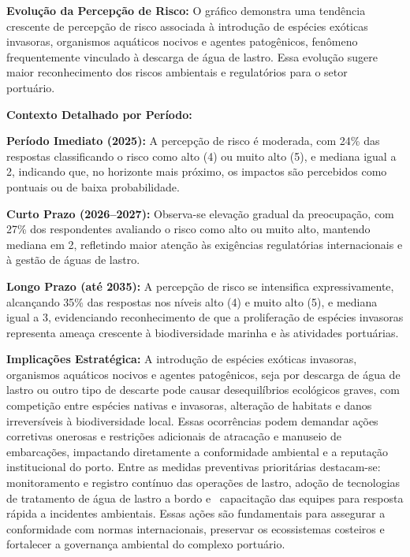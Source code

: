 \documentclass[
  portuguese,
  letterpaper,
  DIV=11,
  numbers=noendperiod]{scrreprt}
\begin{document}
\begin{tcolorbox}[enhanced jigsaw, breakable, leftrule=.75mm, opacitybacktitle=0.6, coltitle=black, rightrule=.15mm, colbacktitle=quarto-callout-tip-color!10!white, colframe=quarto-callout-tip-color-frame, titlerule=0mm, bottomtitle=1mm, colback=white, toprule=.15mm, toptitle=1mm, left=2mm, title=\textcolor{quarto-callout-tip-color}{\faLightbulb}\hspace{0.5em}{Destaques}, opacityback=0, bottomrule=.15mm, arc=.35mm]

\textbf{Evolução da Percepção de Risco:} O gráfico demonstra uma
tendência crescente de percepção de risco associada à introdução de
espécies exóticas invasoras, organismos aquáticos nocivos e agentes
patogênicos, fenômeno frequentemente vinculado à descarga de água de
lastro. Essa evolução sugere maior reconhecimento dos riscos ambientais
e regulatórios para o setor portuário.~

\textbf{Contexto Detalhado por Período:}

\textbf{Período Imediato (2025):} A percepção de risco é moderada, com
24\% das respostas classificando o risco como alto (4) ou muito alto
(5), e mediana igual a 2, indicando que, no horizonte mais próximo, os
impactos são percebidos como pontuais ou de baixa probabilidade.

\textbf{Curto Prazo (2026--2027):} Observa-se elevação gradual da
preocupação, com 27\% dos respondentes avaliando o risco como alto ou
muito alto, mantendo mediana em 2, refletindo maior atenção às
exigências regulatórias internacionais e à gestão de águas de lastro.

\textbf{Longo Prazo (até 2035):} A percepção de risco se intensifica
expressivamente, alcançando 35\% das respostas nos níveis alto (4) e
muito alto (5), e mediana igual a 3, evidenciando reconhecimento de que
a proliferação de espécies invasoras representa ameaça crescente à
biodiversidade marinha e às atividades portuárias.

\textbf{Implicações Estratégica:} A introdução de espécies exóticas
invasoras, organismos aquáticos nocivos e agentes patogênicos, seja por
descarga de água de lastro ou outro tipo de descarte pode causar
desequilíbrios ecológicos graves, com competição entre espécies nativas
e invasoras, alteração de habitats e danos irreversíveis à
biodiversidade local. Essas ocorrências podem demandar ações corretivas
onerosas e restrições adicionais de atracação e manuseio de embarcações,
impactando diretamente a conformidade ambiental e a reputação
institucional do porto. Entre as medidas preventivas prioritárias
destacam-se: monitoramento e registro contínuo das operações de lastro,
adoção de tecnologias de tratamento de água de lastro a bordo e~
capacitação das equipes para resposta rápida a incidentes ambientais.
Essas ações são fundamentais para assegurar a conformidade com normas
internacionais, preservar os ecossistemas costeiros e fortalecer a
governança ambiental do complexo portuário.

\end{tcolorbox}
\end{document}
